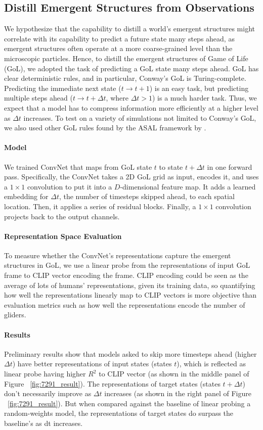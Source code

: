 \documentclass{article}
\begin{document}
\subsection{Distill Emergent Structures from Observations}
We hypothesize that the capability to distill a world's emergent structures might correlate with its capability to predict a future state many steps ahead, as emergent structures often operate at a more coarse-grained level than the microscopic particles. 
Hence, to distill the emergent structures of Game of Life (GoL), we adopted the task of predicting a GoL state many steps ahead. 
GoL has clear deterministic rules, and in particular, Conway's GoL is Turing-complete. 
Predicting the immediate next state ($t \rightarrow t+1$) is an easy task, but predicting multiple steps ahead ($t \rightarrow t+\Delta t$, where $\Delta t>1$) is a much harder task. 
Thus, we expect that a model has to compress information more efficiently at a higher level as $\Delta t$ increases. To test on a variety of simulations not limited to Conway's GoL, we also used other GoL rules found by the ASAL framework by \cite{kumar_automating_2024}.
\paragraph{Model}
We trained ConvNet that maps from GoL state $t$ to state $t+\Delta t$ in one forward pass. Specifically, the ConvNet takes a 2D GoL grid as input, encodes it, and uses a $1 \times 1$ convolution to put it into a $D$-dimensional feature map. 
It adds a learned embedding for $\Delta t$, the number of timesteps skipped ahead, to each spatial location. Then, it applies a series of residual blocks. Finally, a $1 \times 1$ convolution projects back to the output channels.
\paragraph{Representation Space Evaluation}
To measure whether the ConvNet's representations capture the emergent structures in GoL, we use a linear probe from the representations of input GoL frame to CLIP vector encoding the frame. 
CLIP encoding could be seen as the average of lots of humans' representations, given its training data, so quantifying how well the representations linearly map to CLIP vectors is more objective than evaluation metrics such as how well the representations encode the number of gliders.

\paragraph{Results} Preliminary results show that models asked to skip more timesteps ahead (higher $\Delta t$) have better representations of input states (states $t$), which is reflected as linear probe having higher $R^{2}$ to CLIP vector (as shown in the middle panel of Figure ~\ref{fig:7291_result}). 
The representations of target states (states $t+\Delta t$) don't necessarily improve as $\Delta t$ increases (as shown in the right panel of Figure ~\ref{fig:7291_result}). But when compared against the baseline of linear probing a random-weights model, the representations of target states do surpass the baseline's as dt increases.
\end{document}
